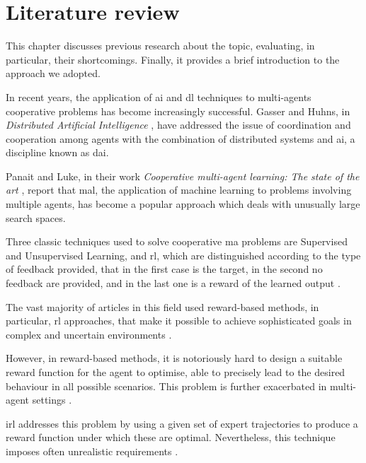 \chapter{Literature review}
\label{chap:stateoftheart}
This chapter discusses previous research about the topic, evaluating, in particular, 
their shortcomings. Finally, it provides a brief introduction to the approach we 
adopted.


In recent years, the application of \gls{ai} and \gls{dl} techniques to multi-agents 
cooperative problems has become increasingly successful.
Gasser and Huhns, in \emph{Distributed Artificial Intelligence} 
\cite[][]{gasser2014distributed}, have addressed the issue of coordination and 
cooperation among agents with the combination of distributed systems and 
\gls{ai}, a discipline known as \gls{dai}.

Panait and Luke, in their work \emph{Cooperative multi-agent learning: The state 
of the art} \cite[][]{panait2005cooperative}, report that \gls{mal}, the application 
of machine learning to problems involving multiple agents, has become a popular 
approach which deals with unusually large search spaces. 

Three classic techniques used to solve cooperative \gls{ma} problems are 
Supervised and Unsupervised Learning, and \gls{rl}, which are distinguished 
according to the type of feedback provided, that in the first case is the target, in 
the second no feedback are provided, and in the last one is a reward of the 
learned output \cite[][]{panait2005cooperative}.

The vast majority of articles in this field used reward-based methods, in particular, 
\gls{rl} approaches, that make it possible to achieve sophisticated goals in 
complex and uncertain environments \cite[][]{oliehoek2012decentralised}. 

However, in reward-based methods, it is notoriously hard to design a suitable 
reward function for the agent to optimise, able to precisely lead to the desired 
behaviour in all possible scenarios. This problem is further exacerbated in 
multi-agent settings \cite[][]{hadfield2017inverse, oliehoek2012decentralised}.

\gls{irl} addresses this problem by using a given set of expert trajectories to 
produce a reward function under which these are optimal. 
Nevertheless, this technique imposes often unrealistic requirements 
\cite[][]{vsovsic2016inverse}.

